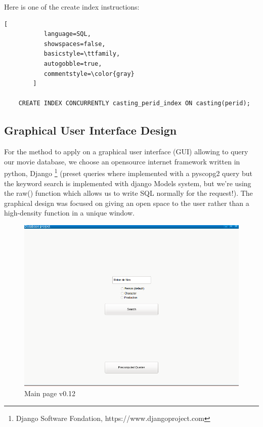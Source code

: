 \documentclass{article}
\begin{document}
Here is one of the create index instructions:
\begin{lstlisting}[
           language=SQL,
           showspaces=false,
           basicstyle=\ttfamily,
           autogobble=true,
           commentstyle=\color{gray}
        ]
        
    CREATE INDEX CONCURRENTLY casting_perid_index ON casting(perid);
    \end{lstlisting}

\subsection{Graphical User Interface Design}

For the method to apply on a graphical user interface (GUI) allowing to query our movie database, we choose an opensource internet framework written in python, Django \footnote{Django Software Fondation, https://www.djangoproject.com} (preset queries where implemented with a pyscopg2 query but the keyword search is implemented with django Models system, but we're using the raw() function which allows us to write SQL normally for the request!). The graphical design was focused on giving an open space to the user rather than a high-density function in a unique window.\\

\begin{figure}[H]
        \includegraphics[width=\linewidth]{mainpage.png}
        \captionsetup{justification=centering}
        \caption{Main page v0.12}
    \end{figure}
\end{document}
